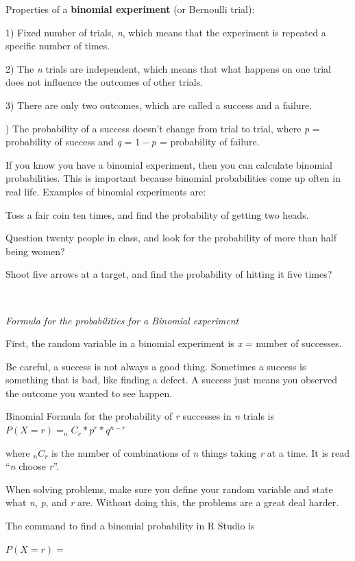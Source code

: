 \documentclass[
]{book}
\begin{document}
Properties of a \textbf{binomial experiment} (or Bernoulli trial):

1) Fixed number of trials, \emph{n}, which means that the experiment is repeated a specific number of times.

2) The \emph{n} trials are independent, which means that what happens on one trial does not influence the outcomes of other trials.

3) There are only two outcomes, which are called a success and a failure.

) The probability of a success doesn't change from trial to trial, where \emph{p} = probability of success and \emph{q} = \(1-p\) = probability of failure.

If you know you have a binomial experiment, then you can calculate binomial probabilities. This is important because binomial probabilities come up often in real life. Examples of binomial experiments are:

Toss a fair coin ten times, and find the probability of getting two heads.

Question twenty people in class, and look for the probability of more than half being women?

Shoot five arrows at a target, and find the probability of hitting it five times?

\textbf{\\
}

\emph{Formula for the probabilities for a Binomial experiment}

First, the random variable in a binomial experiment is \emph{x} = number of successes.

Be careful, a success is not always a good thing. Sometimes a success is something that is bad, like finding a defect. A success just means you observed the outcome you wanted to see happen.

Binomial Formula for the probability of \emph{r} successes in \emph{n} trials is \(P(X=r)=_nC_r*p^r*q^{n-r}\)

where \(_nC_r\) is the number of combinations of \emph{n} things taking \emph{r} at a time. It
is read ``\emph{n} choose \emph{r}''.

When solving problems, make sure you define your random variable and state what \emph{n}, \emph{p}, and \emph{r} are. Without doing this, the problems are a great deal harder.

The command to find a binomial probability in R Studio is

\(P(X=r)=\)
\end{document}
